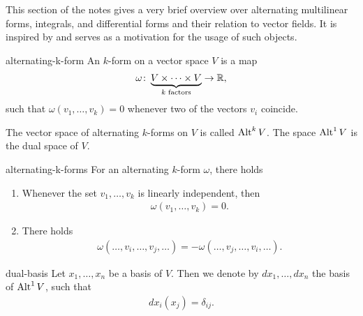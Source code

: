 \begin{intro}
  This section of the notes gives a very brief overview over
  alternating multilinear forms, integrals, and differential forms and
  their relation to vector fields. It is inspired by \cite{Hiptmair02}
  and serves as a motivation for the usage of such objects.
\end{intro}

\begin{Definition}{alternating-k-form}
  An  $k$-form on a vector space $V$ is a map
  \begin{gather}
    \omega\colon\underbrace{V\times \dots\times V}_{k \text{ factors}} \to \mathbb R,
  \end{gather}
  such that $\omega(v_1,\dots,v_k) = 0$ whenever two of the vectors
  $v_i$ coincide.

  The vector space of alternating $k$-forms on $V$ is called
  $\operatorname{Alt}^k V$. The space $\operatorname{Alt}^1 V$ is the dual space of $V$.
\end{Definition}

\begin{Lemma}{alternating-k-forms}
  For an alternating $k$-form $\omega$, there holds
  \begin{enumerate}
  \item Whenever the set $v_1,\dots,v_k$ is linearly independent, then
    \begin{gather}
      \omega(v_1,\dots,v_k) = 0.
    \end{gather}
  \item There holds
    \begin{gather}
      \omega(\ldots,v_i,\ldots,v_j,\ldots) = - \omega(\ldots,v_j,\ldots,v_i,\ldots).
    \end{gather}
  \end{enumerate}
\end{Lemma}

\begin{Notation}{dual-basis}
  Let $x_1,\dots,x_n$ be a basis of $V$. Then we denote by $dx_1,\dots,dx_n$ the basis of $\operatorname{Alt}^1V$,
  such that
  \begin{gather}
    dx_i(x_j) = \delta_{ij}.
  \end{gather}
\end{Notation}


